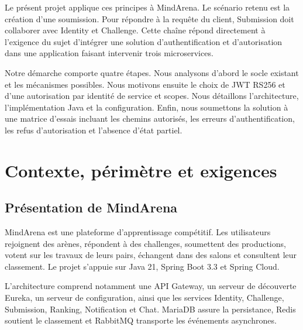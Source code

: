 \documentclass[12pt,a4paper,oneside]{report}
\begin{document}
Le présent projet applique ces principes à MindArena. Le scénario retenu est la
création d'une soumission. Pour répondre à la requête du client, Submission doit
collaborer avec Identity et Challenge. Cette chaîne répond directement à
l'exigence du sujet d'intégrer une solution d'authentification et d'autorisation
dans une application faisant intervenir trois microservices.

Notre démarche comporte quatre étapes. Nous analysons d'abord le socle existant
et les mécanismes possibles. Nous motivons ensuite le choix de JWT RS256 et d'une
autorisation par identité de service et scopes. Nous détaillons l'architecture,
l'implémentation Java et la configuration. Enfin, nous soumettons la solution à
une matrice d'essais incluant les chemins autorisés, les erreurs d'authentification,
les refus d'autorisation et l'absence d'état partiel.

\chapter{Contexte, périmètre et exigences}

\section{Présentation de MindArena}
MindArena est une plateforme d'apprentissage compétitif. Les utilisateurs
rejoignent des arènes, répondent à des challenges, soumettent des productions,
votent sur les travaux de leurs pairs, échangent dans des salons et consultent
leur classement. Le projet s'appuie sur Java 21, Spring Boot 3.3 et Spring Cloud.

L'architecture comprend notamment une API Gateway, un serveur de découverte
Eureka, un serveur de configuration, ainsi que les services Identity, Challenge,
Submission, Ranking, Notification et Chat. MariaDB assure la persistance,
Redis soutient le classement et RabbitMQ transporte les événements asynchrones.
\end{document}
